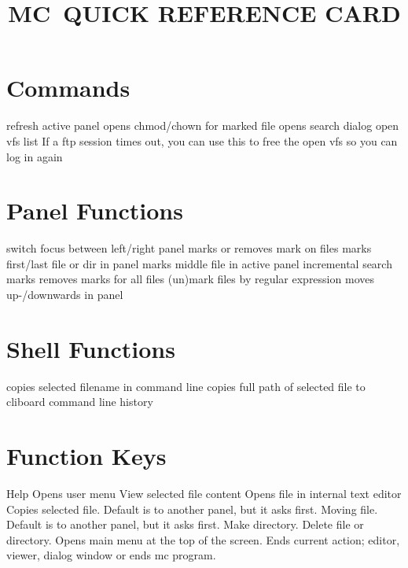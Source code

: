 
\def\content{MC}
\def\versionnumber{0.1}  %
\def\version{v\versionnumber\ \month\ \year}




\title{\uppercase{\content\ quick reference card}}

\shortintro

\vskip 0.5cm

\section{Commands}{}
	{refresh active panel}
	{opens chmod/chown for marked file}
	{opens search dialog}
	{open vfs list}
\cmdExmpl{}	{If a ftp session times out, you can use this to free the open vfs so you can log in again}


\section{Panel Functions}{}
\cmdS{\tab}	{switch focus between left/right panel}
	{marks or removes mark on files}
	{marks first/last file or dir in panel}
	{marks middle file in active panel}
	{incremental search}
\cmdS{$\ast$}	{marks \or removes marks for all files}
\cmdS{+~\bs}	{(un)mark files by regular expression}
	{moves up-/downwards in panel}


\section{Shell Functions}{}

\cmdS{\alt \enter}	{copies selected filename in command line}
\cmdS{\ctrl \shift \enter}	{copies full path of selected file to cliboard}
	{command line history}


\section{Function Keys}{}
	{Help}
	{Opens user menu}
	{View selected file content}
	{Opens file in internal text editor}
	{Copies selected file. Default is to another panel, but it asks first.}
	{Moving file. Default is to another panel, but it asks first.}
	{Make directory.}
	{Delete file or directory.}
	{Opens main menu at the top of the screen.}
	{Ends current action; editor, viewer, dialog window or ends mc program.}

